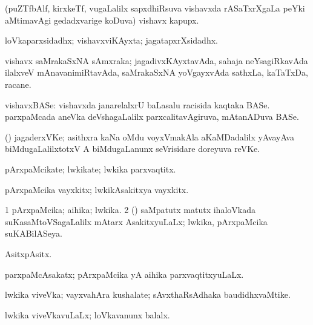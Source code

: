 \begin{center}
\bentry
{} 
\gl{\nA}
\expl{}
\bmng
(puZTfbAlf, kirxkeTf, \mo vugaLalilx sapxdhiRsuva vishavxda rASaTxrXgaLa peYki aMtimavAgi gedadxvarige koDuva) vishavx kapupx. 
\emng
\eentry

\bentry
{} 
\gl{\gu}
\expl{}
\bmng
loVkaparxsidadhx; vishavxviKAyxta; jagatapxrXsidadhx. 
\emng
\eentry

\bentry
{} 
\gl{\nA}
\expl{}
\bmng
vishavx saMrakaSxNA sAmxraka; jagadivxKAyxtavAda, sahaja neYsagiRkavAda ilalxveV mAnavanimiRtavAda, saMrakaSxNA yoVgayxvAda sathxLa, kaTaTxDa, racane. 
\emng
\eentry

\bentry
{} 
\gl{\nA}
\expl{}
\bmng
vishavxBASe: 
\banum
{} vishavxda janarelalxrU baLasalu racisida kaqtaka BASe. 
 parxpaMcada aneVka deVshagaLalilx parxcalitavAgiruva, mAtanADuva BASe. 
\eanum
\emng
\eentry

\bentry
{} 
\gl{\nA}
\expl{}
\bmng
(\Bwvi) jagaderxVKe; asithxra kaNa oMdu voyxVmakAla  aKaMDadalilx yAvayAva biMdugaLalilxtotxV A biMdugaLanunx seVrisidare doreyuva reVKe. 
\emng
\eentry

\bentry
{} 
\gl{\nA}
\expl{}
\bmng
pArxpaMcikate; lwkikate; lwkika parxvaqtitx. 
\emng
\eentry

\bentry
{} 
\gl{\nA}
\expl{}
\bmng
pArxpaMcika vayxkitx; lwkikAsakitxya vayxkitx. 
\emng
\eentry

\bentry
{} 
\gl{\gu}
\bmng
\bnum
\num{1} pArxpaMcika; aihika; lwkika. 
\num{2} (\kanmu) saMpatutx matutx ihaloVkada suKasaMtoVSagaLalilx mAtarx AsakitxyuLaLx; lwkika, pArxpaMcika suKABilASeya. 
\enum
\emng

\noindent 
\gl{\pagu}
\expl{}
\bmng
{} AsitxpAsitx. 
\emng
\eentry

\bentry
{} 
\gl{\gu}
\expl{}
\bmng
parxpaMcAsakatx; pArxpaMcika yA aihika parxvaqtitxyuLaLx. 
\emng
\eentry

\bentry
{} 
\gl{\nA}
\expl{}
\bmng
lwkika viveVka; vayxvahAra kushalate; sAvxthaRsAdhaka baudidhxvaMtike. 
\emng
\eentry

\bentry
{} 
\gl{\gu}
\expl{}
\bmng
lwkika viveVkavuLaLx; loVkavanunx balalx. 
\emng
\eentry


\end{center}
